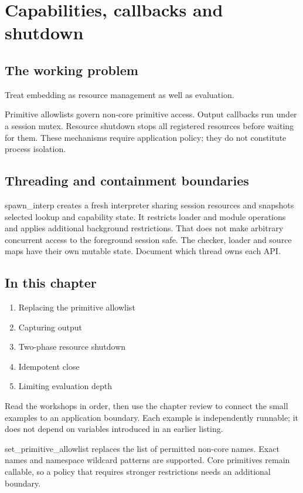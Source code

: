 \chapter{Capabilities, callbacks and shutdown}\label{ch:21}
\section*{The working problem}
Treat embedding as resource management as well as evaluation.

Primitive allowlists govern non-core primitive access. Output callbacks run under a session mutex. Resource shutdown stops all registered resources before waiting for them. These mechanisms require application policy; they do not constitute process isolation.

\section*{Threading and containment boundaries}
spawn\_interp creates a fresh interpreter sharing session resources and snapshots selected lookup and capability state. It restricts loader and module operations and applies additional background restrictions. That does not make arbitrary concurrent access to the foreground session safe. The checker, loader and source maps have their own mutable state. Document which thread owns each API.

\section*{In this chapter}
\begin{enumerate}
\item Replacing the primitive allowlist
\item Capturing output
\item Two-phase resource shutdown
\item Idempotent close
\item Limiting evaluation depth
\end{enumerate}
Read the workshops in order, then use the chapter review to connect the small examples to an application boundary. Each example is independently runnable; it does not depend on variables introduced in an earlier listing.

\clearpage
{}
set\_primitive\_allowlist replaces the list of permitted non-core names. Exact names and namespace wildcard patterns are supported. Core primitives remain callable, so a policy that requires stronger restrictions needs an additional boundary.

